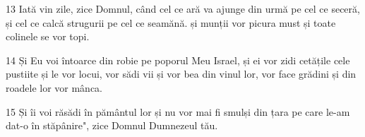 \par 13 Iată vin zile, zice Domnul, când cel ce ară va ajunge din urmă pe cel ce seceră, și cel ce calcă strugurii pe cel ce seamănă. și munții vor picura must și toate colinele se vor topi.
\par 14 Și Eu voi întoarce din robie pe poporul Meu Israel, și ei vor zidi cetățile cele pustiite și le vor locui, vor sădi vii și vor bea din vinul lor, vor face grădini și din roadele lor vor mânca.
\par 15 Și îi voi răsădi în pământul lor și nu vor mai fi smulși din țara pe care le-am dat-o în stăpânire", zice Domnul Dumnezeul tău.



